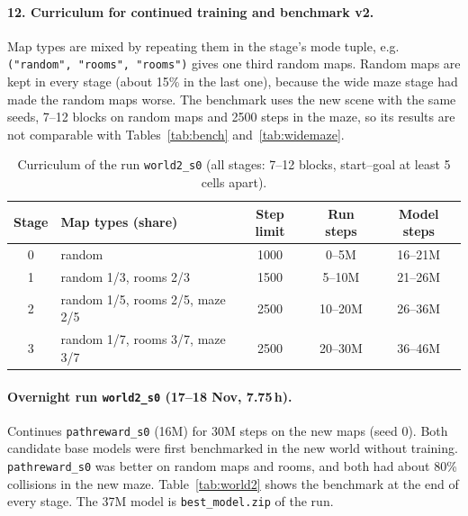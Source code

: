 \documentclass[11pt,a4paper]{article}
\newcommand{\code}[1]{\texttt{#1}}
\begin{document}
\paragraph{12. Curriculum for continued training and benchmark v2.}
Map types are mixed by repeating them in the stage's mode tuple, e.g.
\code{("random", "rooms", "rooms")} gives one third random maps.
Random maps are kept in every stage (about 15\% in the last one), because the
wide maze stage had made the random maps worse. The benchmark uses the new
scene with the same seeds, 7--12 blocks on random maps and 2500 steps in the
maze, so its results are not comparable with Tables~\ref{tab:bench}
and~\ref{tab:widemaze}.

\begin{table}[H]
      \centering\small
      \begin{tabular}{@{}c l c c c@{}}
            \toprule
            Stage & Map types (share)                         & Step limit & Run steps & Model steps \\
            \midrule
            0     & random                                    & 1000       & 0--5M     & 16--21M     \\
            1     & random 1/3, rooms 2/3                     & 1500       & 5--10M    & 21--26M     \\
            2     & random 1/5, rooms 2/5, maze 2/5           & 2500       & 10--20M   & 26--36M     \\
            3     & random 1/7, rooms 3/7, maze 3/7           & 2500       & 20--30M   & 36--46M     \\
            \bottomrule
      \end{tabular}
      \caption{Curriculum of the run \code{world2\_s0} (all stages: 7--12 blocks,
            start--goal at least 5 cells apart).}
      \label{tab:curriculum3}
\end{table}

\paragraph{Overnight run \code{world2\_s0} (17--18 Nov, 7.75\,h).} Continues
\code{pathreward\_s0} (16M) for 30M steps on the new maps (seed 0). Both
candidate base models were first benchmarked in the new world without
training. \code{pathreward\_s0} was better on random maps and rooms, and both
had about 80\% collisions in the new maze. Table~\ref{tab:world2} shows the
benchmark at the end of every stage. The 37M model is \code{best\_model.zip}
of the run.
\end{document}
